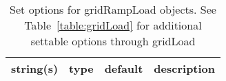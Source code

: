 \begin{table}[ht]
\centering
\begin{tabular}{p{5cm} c c p{7cm}}
\hline
string(s) & type & default & description \\
\hline
\hline
\end{tabular}
\caption{Set options for gridRampLoad objects. See Table~\ref{table:gridLoad} for additional settable options through gridLoad}
\label{table:gridRampLoad}
\end{table}
